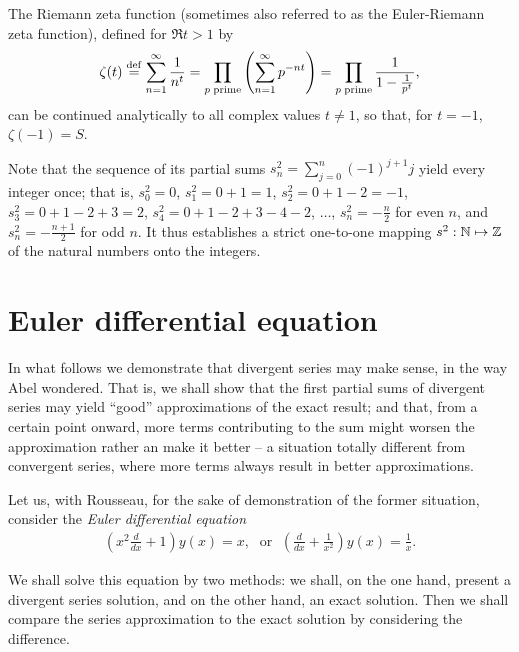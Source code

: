 The Riemann zeta function (sometimes also referred to as the Euler-Riemann zeta function),
defined for $\Re t > 1$ by
\begin{equation}
\zeta (t) \stackrel{{\rm def}}{=}
\sum_{n=1}^\infty \frac{1}{n^t}
=
\prod_{p\;{\rm prime}} \left(\sum_{n=1}^\infty p^{-nt}\right)
=
\prod_{p\;{\rm prime}} \frac{1}{1-\frac{1}{p^t}}
,
\label{2016-m-ds-zeta}
\end{equation}
can be  continued analytically to all complex values $t\neq 1$, so that, for $t=-1$,
$\zeta (-1) = S$.




Note that the sequence of its partial sums $s^2_n=\sum_{j=0}^n (-1)^{j+1} j $
yield every integer once; that is,
$s^2_0 =0$,
$s^2_1 =0+1=1$,
$s^2_2 =0+1-2=-1$,
$s^2_3 =0+1-2+3=2$,
$s^2_4 =0+1-2+3-4-2$,
$\ldots$,
$s^2_n =-\frac{n}{2}$ for even $n$,
and
$s^2_n =-\frac{n+1}{2}$ for odd $n$.
It thus establishes a strict one-to-one mapping
$s^2: {\Bbb N} \mapsto {\Bbb Z}$
of the natural numbers onto the integers.


\section{Euler differential equation}

In what follows we demonstrate that divergent series may make sense, in the way Abel
wondered.
That is, we shall show that the first partial sums of divergent series
may yield ``good'' approximations of the exact result; and
that, from a certain point onward, more terms contributing to the
sum  might worsen the approximation rather an make it better -- a situation totally different
from convergent series, where more terms always result in better approximations.

Let us, with Rousseau,
for the sake of demonstration of the former situation,
consider the {\em Euler differential equation}
\begin{equation}
\begin{split}
\left(x^2 \frac{d}{dx} +1\right) y(x) = {x},\;\textrm{ or }\;
\left(\frac{d}{dx} +\frac{1}{x^2}\right) y(x) = \frac{1}{x}.
\end{split}
\label{2011-m-ch-dsee}
\end{equation}

We shall solve this equation by two methods:  we shall, on the one hand,
present a divergent series solution, and on the other hand, an exact solution.
Then we shall  compare the series approximation to the exact solution by considering
the difference.

